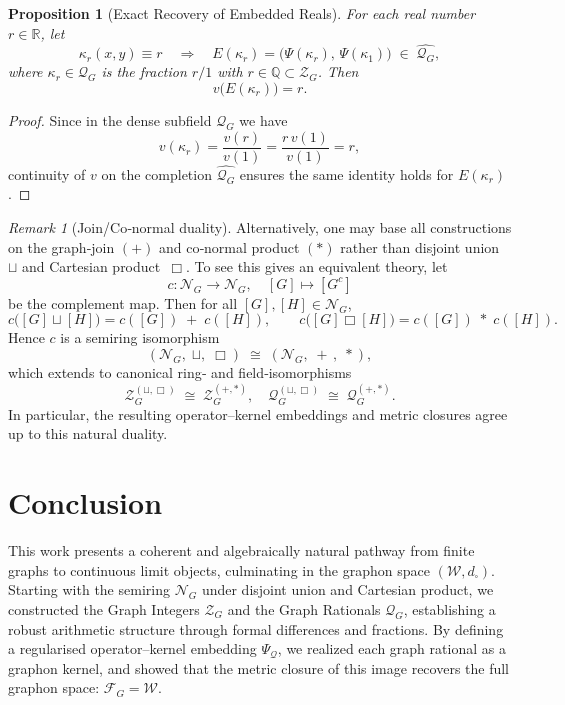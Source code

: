 \documentclass[11pt]{article}
\theoremstyle{definition}
\theoremstyle{plain}
\newtheorem{proposition}[definition]{Proposition}
\theoremstyle{remark}
\newtheorem{remark}[definition]{Remark}
\begin{document}
\begin{proposition}[Exact Recovery of Embedded Reals]
For each real number $r\in\mathbb{R}$, let
\[
\kappa_r(x,y)\equiv r
\quad\Longrightarrow\quad
E(\kappa_r)=\bigl(\Psi(\kappa_r),\,\Psi(\kappa_1)\bigr)
\;\in\;\widehat{\mathcal Q_G},
\]
where $\kappa_r\in\mathcal Q_G$ is the fraction $r/1$ with $r\in\mathbb{Q}\subset\mathcal Z_G$.  Then
\[
v\bigl(E(\kappa_r)\bigr) = r.
\]
\end{proposition}

\begin{proof}
Since in the dense subfield $\mathcal Q_G$ we have
\[
v(\kappa_r)=\frac{v(r)}{v(1)}=\frac{r\,v(1)}{v(1)}=r,
\]
continuity of $v$ on the completion $\widehat{\mathcal Q_G}$ ensures the same identity holds for $E(\kappa_r)$.
\end{proof}

\begin{remark}[Join/\!Co‐normal duality]
Alternatively, one may base all constructions on the graph‐join $(+)$ and co‐normal product $(\ast)$ rather than disjoint union~$\sqcup$ and Cartesian product~$\Box$.  To see this gives an equivalent theory, let
\[
  c\colon \mathcal N_G \to \mathcal N_G,\quad [G]\mapsto [G^c]
\]
be the complement map.  Then for all $[G],[H]\in\mathcal N_G$,
\[
  c\bigl([G]\sqcup[H]\bigr)
  = c([G]) \;+\; c([H]),
  \qquad
  c\bigl([G]\Box[H]\bigr)
  = c([G]) \;\ast\; c([H]).
\]
Hence $c$ is a semiring isomorphism
\[
  (\mathcal N_G,\;\sqcup,\;\Box)
  \;\cong\;
  (\mathcal N_G,\;+\,,\;\ast),
\]
which extends to canonical ring‐ and field‐isomorphisms
\[
  \mathcal Z_G^{(\sqcup,\Box)} \;\cong\;\mathcal Z_G^{(+,\ast)},
  \quad
  \mathcal Q_G^{(\sqcup,\Box)} \;\cong\;\mathcal Q_G^{(+,\ast)}.
\]
In particular, the resulting operator–kernel embeddings and metric closures agree up to this natural duality.
\end{remark}
\section{Conclusion}

This work presents a coherent and algebraically natural pathway from finite graphs to continuous limit objects, culminating in the graphon space \((\mathcal{W}, d_\square)\). Starting with the semiring \(\mathcal{N}_G\) under disjoint union and Cartesian product, we constructed the Graph Integers \(\mathcal{Z}_G\) and the Graph Rationals \(\mathcal{Q}_G\), establishing a robust arithmetic structure through formal differences and fractions. By defining a regularised operator–kernel embedding \(\Psi_{\mathcal Q}\), we realized each graph rational as a graphon kernel, and showed that the metric closure of this image recovers the full graphon space: \(\mathcal{F}_G = \mathcal{W}\).
\end{document}
